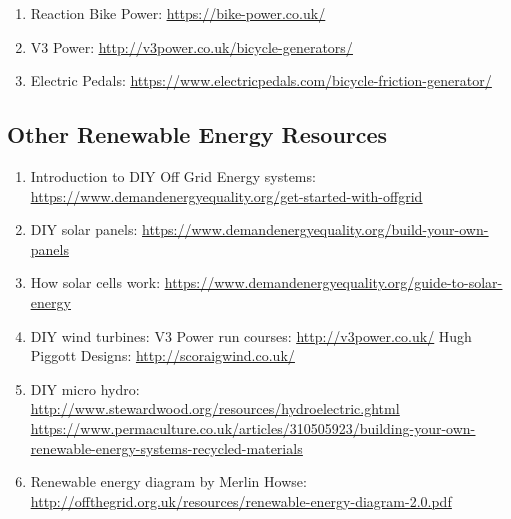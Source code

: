 \documentclass{article}
\theoremstyle{definition}
\theoremstyle{definition}
\theoremstyle{remark}
\begin{document}
    \begin{enumerate}[resume]
      \item Reaction Bike Power: \href{https://bike-power.co.uk/}{\underline{https://bike-power.co.uk/}}
      \item V3 Power: \href{http://v3power.co.uk/bicycle-generators/}{\underline{http://v3power.co.uk/bicycle-generators/}}
      \item Electric Pedals: \href{https://www.electricpedals.com/bicycle-friction-generator/}{\underline{https://www.electricpedals.com/bicycle-friction-generator/}}
    \end{enumerate}
  

  \subsection{Other Renewable Energy Resources} %
  \label{sub:other_renewable_energy_resources}

    \begin{enumerate}[resume]
      \item Introduction to DIY Off Grid Energy systems: \newline
        \href{https://www.demandenergyequality.org/get-started-with-offgrid}{\underline{https://www.demandenergyequality.org/get-started-with-offgrid}}
      \item DIY solar panels: \href{https://www.demandenergyequality.org/build-your-own-panels}{\underline{https://www.demandenergyequality.org/build-your-own-panels}}
      \item How solar cells work: \href{https://www.demandenergyequality.org/guide-to-solar-energy}{\underline{https://www.demandenergyequality.org/guide-to-solar-energy}}
      \item DIY wind turbines: \newline
        V3 Power run courses: \href{http://v3power.co.uk/}{\underline{http://v3power.co.uk/}} \newline
        Hugh Piggott Designs: \href{http://scoraigwind.co.uk/}{\underline{http://scoraigwind.co.uk/}}
      \item DIY micro hydro:  \href{http://www.stewardwood.org/resources/hydroelectric.ghtml}{\underline{http://www.stewardwood.org/resources/hydroelectric.ghtml}} \newline
        \href{https://www.permaculture.co.uk/articles/310505923/building-your-own-renewable-energy-systems-recycled-materials}{\underline{https://www.permaculture.co.uk/articles/310505923/building-your-own-renewable-energy-systems-recycled-materials}}
      \item Renewable energy diagram by Merlin Howse: \newline
        \href{http://offthegrid.org.uk/resources/renewable-energy-diagram-2.0.pdf}{\underline{http://offthegrid.org.uk/resources/renewable-energy-diagram-2.0.pdf}}

    \end{enumerate}
  
\end{document}

